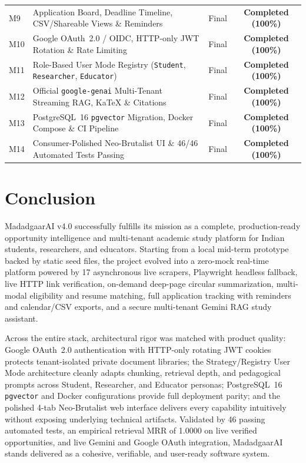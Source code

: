 \documentclass[12pt,a4paper,oneside]{report}
\begin{document}
\begin{table}[htbp]
\begin{tabularx}{\textwidth}{lXcc}
        M9 & Application Board, Deadline Timeline, CSV/Shareable Views \& Reminders & Final & \textcolor{successColor}{\textbf{Completed (100\%)}} \\
        M10 & Google OAuth~2.0 / OIDC, HTTP-only JWT Rotation \& Rate Limiting & Final & \textcolor{successColor}{\textbf{Completed (100\%)}} \\
        M11 & Role-Based User Mode Registry (\texttt{Student}, \texttt{Researcher}, \texttt{Educator}) & Final & \textcolor{successColor}{\textbf{Completed (100\%)}} \\
        M12 & Official \texttt{google-genai} Multi-Tenant Streaming RAG, KaTeX \& Citations & Final & \textcolor{successColor}{\textbf{Completed (100\%)}} \\
        M13 & PostgreSQL~16 \texttt{pgvector} Migration, Docker Compose \& CI Pipeline & Final & \textcolor{successColor}{\textbf{Completed (100\%)}} \\
        M14 & Consumer-Polished Neo-Brutalist UI \& 46/46 Automated Tests Passing & Final & \textcolor{successColor}{\textbf{Completed (100\%)}} \\
        \bottomrule
    \end{tabularx}
\end{table}

\chapter{Conclusion}

MadadgaarAI v4.0 successfully fulfills its mission as a complete, production-ready opportunity intelligence and multi-tenant academic study platform for Indian students, researchers, and educators. Starting from a local mid-term prototype backed by static seed files, the project evolved into a zero-mock real-time platform powered by 17 asynchronous live scrapers, Playwright headless fallback, live HTTP link verification, on-demand deep-page circular summarization, multi-modal eligibility and resume matching, full application tracking with reminders and calendar/CSV exports, and a secure multi-tenant Gemini RAG study assistant.

Across the entire stack, architectural rigor was matched with product quality: Google OAuth~2.0 authentication with HTTP-only rotating JWT cookies protects tenant-isolated private document libraries; the Strategy/Registry User Mode architecture cleanly adapts chunking, retrieval depth, and pedagogical prompts across Student, Researcher, and Educator personas; PostgreSQL~16 \texttt{pgvector} and Docker configurations provide full deployment parity; and the polished 4-tab Neo-Brutalist web interface delivers every capability intuitively without exposing underlying technical artifacts. Validated by 46 passing automated tests, an empirical retrieval MRR of 1.0000 on live verified opportunities, and live Gemini and Google OAuth integration, MadadgaarAI stands delivered as a cohesive, verifiable, and user-ready software system.
\end{document}
